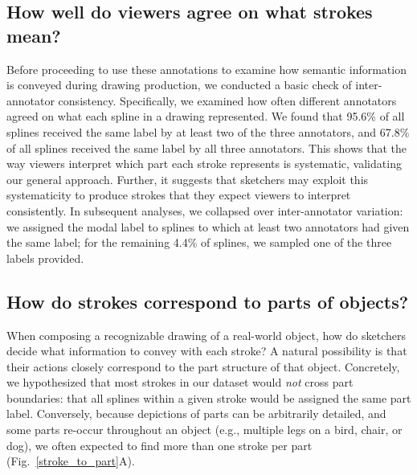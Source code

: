 \documentclass[10pt,letterpaper]{article}
\begin{document}
\subsection{How well do viewers agree on what strokes mean?}

Before proceeding to use these annotations to examine how semantic information is conveyed during drawing production, we conducted a basic check of inter-annotator consistency. 
Specifically, we examined how often different annotators agreed on what each spline in a drawing represented.
We found that 95.6\% of all splines received the same label by at least two of the three annotators, and 67.8\% of all splines received the same label by all three annotators. 
This shows that the way viewers interpret which part each stroke represents is systematic, validating our general approach. 
Further, it suggests that sketchers may exploit this systematicity to produce strokes that they expect viewers to interpret consistently. 
In subsequent analyses, we collapsed over inter-annotator variation: we assigned the modal label to splines to which at least two annotators had given the same label; for the remaining 4.4\% of splines, we sampled one of the three labels provided.

\subsection{How do strokes correspond to parts of objects?}

When composing a recognizable drawing of a real-world object, how do sketchers decide what information to convey with each stroke? 
A natural possibility is that their actions closely correspond to the part structure of that object.
Concretely, we hypothesized that most strokes in our dataset would \emph{not} cross part boundaries: that all splines within a given stroke would be assigned the same part label. 
Conversely, because depictions of parts can be arbitrarily detailed, and some parts re-occur throughout an object (e.g., multiple legs on a bird, chair, or dog), we often expected to find more than one stroke per part  (Fig.~\ref{stroke_to_part}A).
\end{document}
